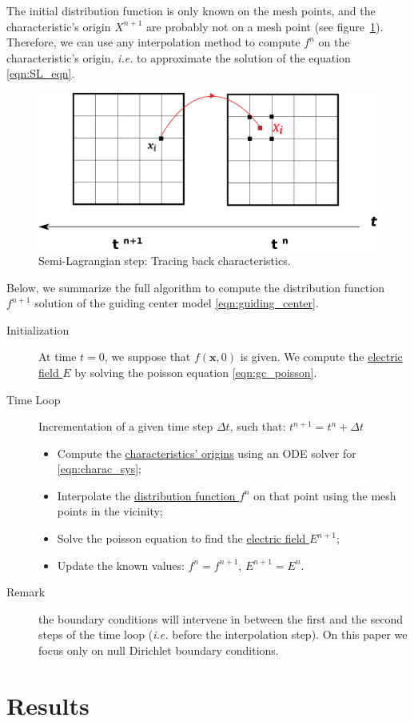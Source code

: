 \documentclass[proc]{edpsmath}
\begin{document}
The initial distribution function is only known on the mesh points, and the characteristic's origin $X^{n+1}$ are probably not on a mesh point (see figure~\ref{fig:SL}). Therefore, we can use any interpolation method to compute $f^n$ on the characteristic's origin, \emph{i.e.} to approximate the solution of the equation \eqref{eqn:SL_eqn}.

\begin{figure}[h!]
	\label{fig:SL}
	\centering
	\includegraphics[scale=0.5]{figures/SL.png} 
	\caption{Semi-Lagrangian step: Tracing back characteristics.}
\end{figure}

Below, we summarize the full algorithm to compute the distribution function $f^{n+1}$ solution of the guiding center model \eqref{eqn:guiding_center}.

\begin{description}
	\item[Initialization] At time $t=0$, we suppose that $f(\mathbf{x}, 0)$ is given. We compute the \underline{electric field $E$} by solving the poisson equation \eqref{eqn:gc_poisson}.
	\item[Time Loop] Incrementation of a given time step $\Delta t$, such that: $t^{n+1} = t^n + \Delta t$
		\begin{itemize}
		\item Compute the \underline{characteristics' origins} using an ODE solver for \eqref{eqn:charac_sys};
		\item Interpolate the \underline{distribution function $f^n$} on that point using the mesh points in the vicinity;
		\item Solve the poisson equation to find the \underline{electric field $E^{n+1}$};
		\item Update the known values: $f^n = f^{n+1}$, $E^{n+1}=E^n$.
		\end{itemize}
	\item[Remark] the boundary conditions will intervene in between the first and the second steps of the time loop (\emph{i.e.} before the interpolation step). On this paper we focus only on null Dirichlet boundary conditions.
\end{description}


\section{Results}
\label{sec:results}




\newpage


\end{document}
